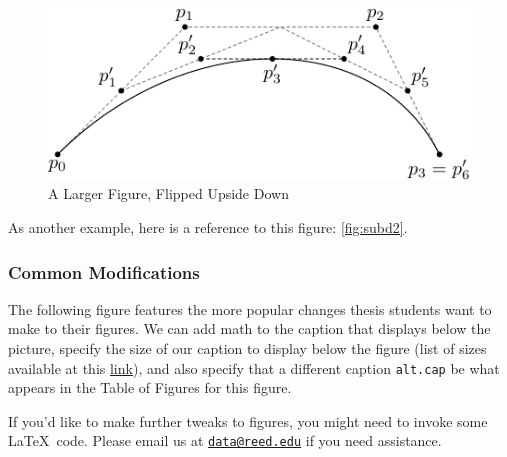 \documentclass[12pt,twoside]{reedthesis}
\begin{document}
  \begin{figure}[h!tbp]
  \centering
  \includegraphics[angle = 180,scale = 1.5]{figure/subdivision.pdf}
  \caption[A Larger Figure, Flipped Upside Down]{\normalsize{A Larger Figure, Flipped Upside Down}}
  \label{fig:subd2}
  \end{figure}
  
  As another example, here is a reference to this figure:
  \autoref{fig:subd2}.
  
  \subsubsection{Common Modifications}\label{common-modifications-1}
  
  The following figure features the more popular changes thesis students
  want to make to their figures. We can add math to the caption that
  displays below the picture, specify the size of our caption to display
  below the figure (list of sizes available at this
  \href{http://www.emerson.emory.edu/services/latex/latex_169.html\#SEC169}{link}),
  and also specify that a different caption \texttt{alt.cap} be what
  appears in the Table of Figures for this figure.
  
  If you'd like to make further tweaks to figures, you might need to
  invoke some \LaTeX~code. Please email us at
  \href{mailto:data@reed.edu}{\nolinkurl{data@reed.edu}} if you need
  assistance.
  
  \begin{Shaded}
  \begin{Highlighting}[]
  \NormalTok{(}\NormalTok{, }
         \NormalTok{,}
         \CharTok{\textbackslash{}\textbackslash{}}\NormalTok{,}
         \NormalTok{,}
         \NormalTok{)}
  \end{Highlighting}
  \end{Shaded}
  
\end{document}
